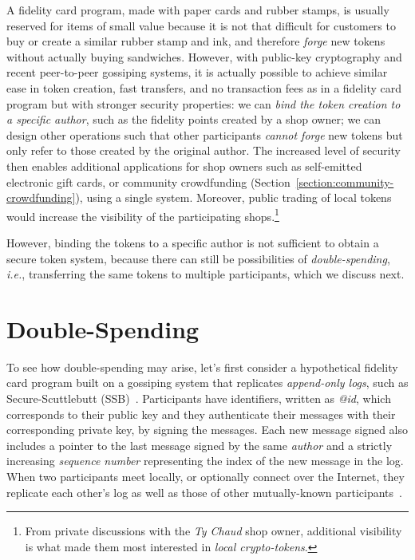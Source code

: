 \documentclass[sigconf,9pt]{acmart}
\begin{document}
A fidelity card program, made with paper cards and rubber stamps, is usually reserved for items of small value because it is not that difficult for customers to buy or create a similar rubber stamp and ink, and therefore \textit{forge} new tokens without actually buying sandwiches. However, with public-key cryptography and recent peer-to-peer gossiping systems, it is actually possible to achieve similar ease in token creation, fast transfers, and no transaction fees as in a fidelity card program but with stronger security properties: we can \textit{bind the token creation to a specific author}, such as the fidelity points created by a shop owner; we can design other operations such that other participants \textit{cannot forge} new tokens but only refer to those created by the original author.  The increased level of security then enables additional applications for shop owners such as self-emitted electronic gift cards, or community crowdfunding (Section~\ref{section:community-crowdfunding}), using a single system. Moreover, public trading of local tokens would increase the visibility of the participating shops.\footnote{From private discussions with the \textit{Ty Chaud} shop owner, additional visibility is what made them most interested in \textit{local crypto-tokens}.}

However, binding the tokens to a specific author is not sufficient to obtain a secure token system, because there can still be possibilities of \textit{double-spending}, \textit{i.e.}, transferring the same tokens to multiple participants, which we discuss next. 



\section{Double-Spending}
\label{section:double-spending}

To see how double-spending may arise, let's first consider a hypothetical  fidelity card program built on a gossiping system that replicates \textit{append-only logs}, such as Secure-Scuttlebutt (SSB)~\cite{kermarrec2020gossiping}. Participants have identifiers, written as \textit{@id}, which corresponds to their public key and they authenticate their messages with their corresponding private key, by signing the messages. Each new message signed also includes a pointer to the last message signed by the same \textit{author} and a strictly increasing \textit{sequence number} representing the index of the new message in the log.  When two participants meet locally, or optionally connect over the Internet, they replicate each other's log as well as those of other mutually-known participants~\cite{kermarrec2020gossiping}.
\end{document}
